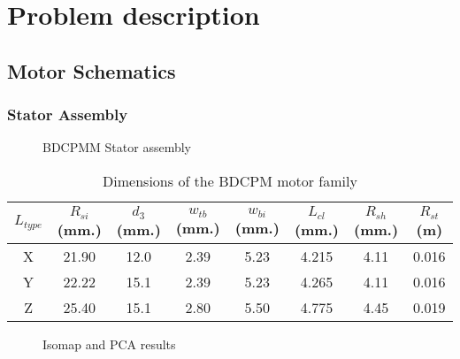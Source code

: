 \section{Problem description}
\label{problem}

\subsection{Motor Schematics}

\subsubsection{Stator Assembly}

\begin{figure}[ht]\begin{center}
 \caption{BDCPMM Stator assembly}
 \label{bdcpmStator}
\end{center}\end{figure}


\begin{table}[!ht]
\centering
\begin{tabular}{|c|c|c|c|c|c|c|c|}
 \hline
 $L_{type}$ & $R_{si}$ (mm.) & $d_3$ (mm.) & $w_{tb}$ (mm.) & $w_{bi}$ (mm.) & $L_{cl}$ (mm.)& $R_{sh}$ (mm.) & $R_{st}$ (m) \\
 \hline
 X & 21.90 & 12.0 & 2.39 & 5.23 & 4.215 & 4.11 & 0.016 \\
 \hline
 Y & 22.22 & 15.1 & 2.39 & 5.23 & 4.265 & 4.11 & 0.016 \\
 \hline
 Z & 25.40 & 15.1 & 2.80 & 5.50 & 4.775 & 4.45 & 0.019 \\
 \hline
 \end{tabular}
\caption{Dimensions of the BDCPM motor family}
\label{ltypeDimTable}
\end{table}

\begin{figure}[ht]\begin{center}
 \caption{Isomap and PCA results}
 \label{bdcpmmVar}
\end{center}\end{figure}
